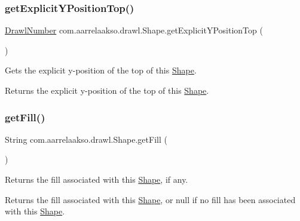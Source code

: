 \subsubsection{\texorpdfstring{get\+Explicit\+Y\+Position\+Top()}{getExplicitYPositionTop()}}
{\footnotesize\ttfamily \hyperlink{classcom_1_1aarrelaakso_1_1drawl_1_1_drawl_number}{Drawl\+Number} com.\+aarrelaakso.\+drawl.\+Shape.\+get\+Explicit\+Y\+Position\+Top (\begin{DoxyParamCaption}{ }\end{DoxyParamCaption})\hspace{0.3cm}{\ttfamily [protected]}}



Gets the explicit y-\/position of the top of this \hyperlink{classcom_1_1aarrelaakso_1_1drawl_1_1_shape}{Shape}. 

\begin{DoxyReturn}{Returns}
the explicit y-\/position of the top of this \hyperlink{classcom_1_1aarrelaakso_1_1drawl_1_1_shape}{Shape}. 
\end{DoxyReturn}
\mbox{\label{classcom_1_1aarrelaakso_1_1drawl_1_1_shape_a0d9a33a3e151aaceeec140bea343a650}} 
\subsubsection{\texorpdfstring{get\+Fill()}{getFill()}}
{\footnotesize\ttfamily String com.\+aarrelaakso.\+drawl.\+Shape.\+get\+Fill (\begin{DoxyParamCaption}{ }\end{DoxyParamCaption})}



Returns the fill associated with this \hyperlink{classcom_1_1aarrelaakso_1_1drawl_1_1_shape}{Shape}, if any. 

\begin{DoxyReturn}{Returns}
the fill associated with this \hyperlink{classcom_1_1aarrelaakso_1_1drawl_1_1_shape}{Shape}, or null if no fill has been associated with this \hyperlink{classcom_1_1aarrelaakso_1_1drawl_1_1_shape}{Shape}. 
\end{DoxyReturn}
\mbox{\label{classcom_1_1aarrelaakso_1_1drawl_1_1_shape_ac9f74d31c332aab76b329edc22080e67}} 
